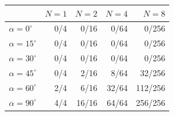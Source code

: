 \begin{tabular}{lrrrr}
\toprule
 & $N=1$ & $N=2$ & $N=4$ & $N=8$\\
\midrule
$\alpha=0^\circ$ & 0/4 & 0/16 & 0/64 & 0/256\\
$\alpha=15^\circ$ & 0/4 & 0/16 & 0/64 & 0/256\\
$\alpha=30^\circ$ & 0/4 & 0/16 & 0/64 & 0/256\\
$\alpha=45^\circ$ & 0/4 & 2/16 & 8/64 & 32/256\\
$\alpha=60^\circ$ & 2/4 & 6/16 & 32/64 & 112/256\\
$\alpha=90^\circ$ & 4/4 & 16/16 & 64/64 & 256/256\\
\bottomrule
\end{tabular}
